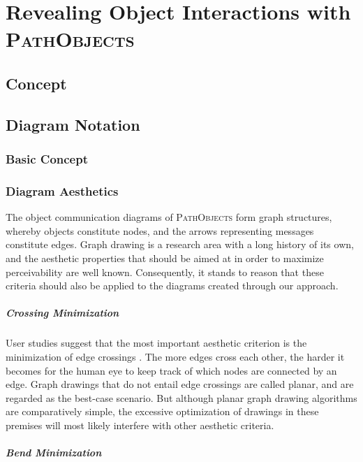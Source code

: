 \chapter{Revealing Object Interactions with \textsc{PathObjects}}
\label{c:approach}

\section{Concept}

\section{Diagram Notation}
\subsection{Basic Concept}
\subsection{Diagram Aesthetics}
The object communication diagrams of \textsc{PathObjects} form graph structures, whereby  objects constitute nodes, and the arrows representing messages constitute edges.
Graph drawing is a research area with a long history of its own, and the aesthetic properties that should be aimed at in order to maximize perceivability are well known.
Consequently, it stands to reason that these criteria should also be applied to the diagrams created through our approach.

\paragraph{Crossing Minimization} User studies suggest that the most important aesthetic criterion is the minimization of edge crossings \cite{purchase_effective_2000, purchase_graph_2004, purchase_graph_2010}.
The more edges cross each other, the harder it becomes for the human eye to keep track of which nodes are connected by an edge.
Graph drawings that do not entail edge crossings are called planar, and are regarded as the best-case scenario.
But although planar graph drawing algorithms are comparatively simple, the excessive optimization of drawings in these premises will most likely interfere with other aesthetic criteria.

\paragraph{Bend Minimization}

